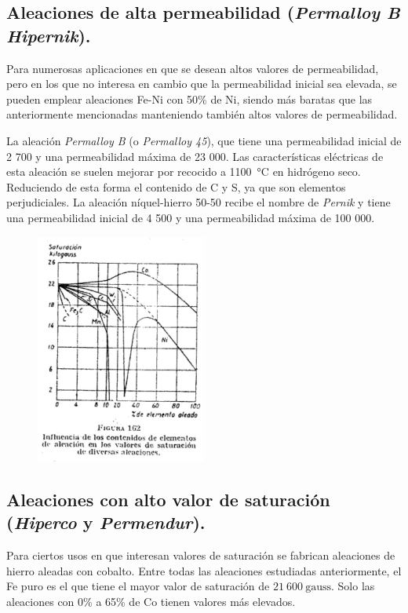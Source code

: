\documentclass[12pt,a4paper]{article}
\begin{document}
\subsection{Aleaciones de alta permeabilidad (\textit{Permalloy B Hipernik}).}

Para numerosas aplicaciones en que se desean altos valores de permeabilidad, pero en los que no interesa en cambio que la permeabilidad inicial sea elevada, se pueden emplear aleaciones Fe-Ni con 50\% de Ni, siendo más baratas que las anteriormente mencionadas manteniendo también altos valores de permeabilidad.

La aleación \textit{Permalloy B} (o \textit{Permalloy 45}), que tiene una permeabilidad inicial de 2 700 y una permeabilidad máxima de 23 000. Las características eléctricas de esta aleación se suelen mejorar por recocido a \SI{1 100}{\celsius} en hidrógeno seco. Reduciendo de esta forma el contenido de C y S, ya que son elementos perjudiciales. La aleación níquel-hierro 50-50 recibe el nombre de \textit{Pernik} y tiene una permeabilidad inicial de 4 500 y una permeabilidad máxima de 100 000.

\begin{figure}[H]    
    \centering         
    \includegraphics[width=0.5\textwidth]{IMAGENES LATEX/8.jpg}
\end{figure}

\subsection{Aleaciones con alto valor de saturación (\textit{Hiperco} y \textit{Permendur}).}

Para ciertos usos en que interesan valores de saturación se fabrican aleaciones de hierro aleadas con cobalto. Entre todas las aleaciones estudiadas anteriormente, el Fe puro es el que tiene el mayor valor de saturación de $21\ 600\ \mathrm{gauss}$. Solo las aleaciones con 0\% a 65\% de Co tienen valores más elevados.
\end{document}
